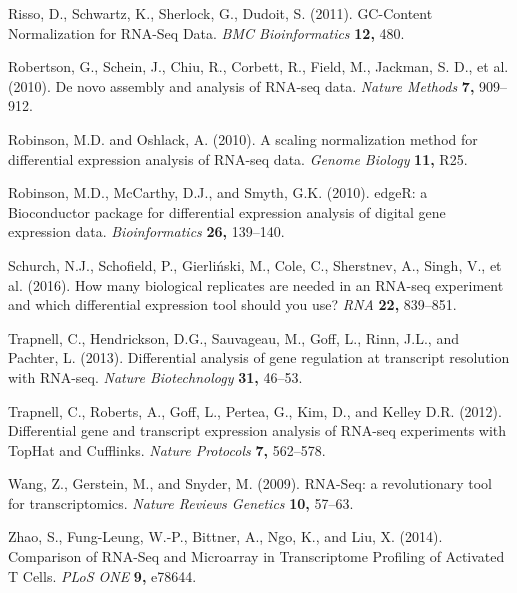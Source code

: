 \documentclass[useAMS,referee]{biom}
\begin{document}
\begin{thebibliography}{}
\bibitem{ } Risso, D., Schwartz, K., Sherlock, G., Dudoit, S. (2011). GC-Content Normalization for RNA-Seq Data. \textit{BMC Bioinformatics} \textbf{12,} 480.

\bibitem{ } Robertson, G., Schein, J., Chiu, R., Corbett, R., Field, M., Jackman, S. D., et al. (2010). De novo assembly and analysis of RNA-seq data. \textit{Nature Methods} \textbf{7,} 909–912.

\bibitem{ } Robinson, M.D. and Oshlack, A. (2010). A scaling normalization method for differential expression analysis of RNA-seq data. \textit{Genome Biology} \textbf{11,} R25.

\bibitem{ } Robinson, M.D., McCarthy, D.J., and Smyth, G.K. (2010). edgeR: a Bioconductor package for differential expression analysis of digital gene expression data. \textit{Bioinformatics} \textbf{26,} 139–140.

\bibitem{ } Schurch, N.J., Schofield, P., Gierliński, M., Cole, C., Sherstnev, A., Singh, V., et al. (2016). How many biological replicates are needed in an RNA-seq experiment and which differential expression tool should you use? \textit{RNA} \textbf{22,} 839–851.

\bibitem{ } Trapnell, C., Hendrickson, D.G., Sauvageau, M., Goff, L., Rinn, J.L., and Pachter, L. (2013). Differential analysis of gene regulation at transcript resolution with RNA-seq.
\textit{Nature Biotechnology} \textbf{31,} 46–53.

\bibitem{ } Trapnell, C., Roberts, A., Goff, L., Pertea, G., Kim, D., and Kelley D.R. (2012). Differential gene and transcript expression analysis of RNA-seq experiments with TopHat and Cufflinks. \textit{Nature Protocols} \textbf{7,} 562–578.

\bibitem{ } Wang, Z., Gerstein, M., and Snyder, M. (2009). RNA-Seq: a revolutionary tool for
transcriptomics. \textit{Nature Reviews Genetics} \textbf{10,} 57–63.

\bibitem{ } Zhao, S., Fung-Leung, W.-P., Bittner, A., Ngo, K., and Liu, X. (2014). Comparison of RNA-Seq and Microarray in Transcriptome Profiling of Activated T Cells. \textit{PLoS ONE} \textbf{9,} e78644.




\end{thebibliography}
\end{document}
